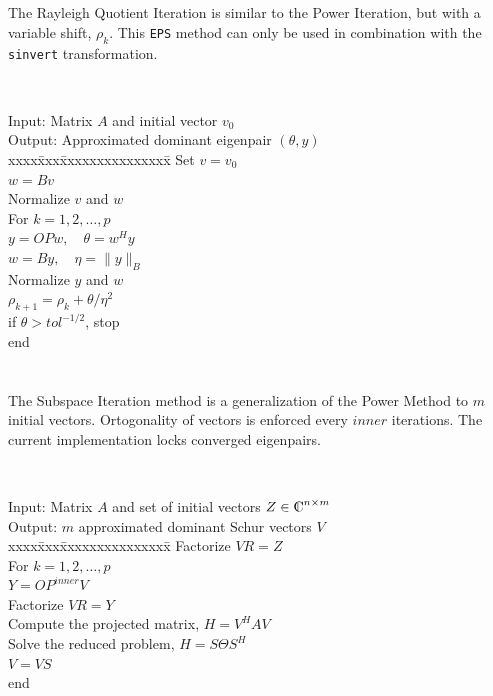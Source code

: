 \section{}

The Rayleigh Quotient Iteration is similar to the Power Iteration, but with a variable shift, $\rho_k$. This \texttt{EPS} method can only be used in combination with the \texttt{sinvert} transformation.
\begin{algorithm}~\rm
\begin{tabbing}
Input: Matrix $A$ and initial vector $v_0$\\
Output: Approximated dominant eigenpair $(\theta,y)$ \\
xxxx\=xxx\=xxxxxxxxxxxxxxx\=\kill
\> Set $v=v_0$\\
\> $w=Bv$\\
\> Normalize $v$ and $w$\\
\> For $k=1,2,\ldots,p$\\
\> \> $y=O\!Pw,\quad\theta=w^Hy$ \\
\> \> $w=By,\quad\eta=\|y\|_B$ \\
\> \> Normalize $y$ and $w$\\
\> \> $\rho_{k+1}=\rho_k+\theta/\eta^2$ \\
\> \> if $\theta>tol^{-1/2}$, stop\\
\> end
\end{tabbing}
\end{algorithm}

\section{}

The Subspace Iteration method is a generalization of the Power Method to $m$ initial vectors. Ortogonality of vectors is enforced every $inner$ iterations. The current implementation locks converged eigenpairs.

\begin{algorithm}~\rm
\begin{tabbing}
Input: Matrix $A$ and set of initial vectors $Z\in\Co^{n\times m} $\\
Output: $m$ approximated dominant Schur vectors $V$ \\
xxxx\=xxx\=xxxxxxxxxxxxxxx\=\kill
\> Factorize $VR=Z$\\
\> For $k=1,2,\ldots,p$\\
\> \> $Y=O\!P^{inner}V$ \\
\> \> Factorize $VR=Y$ \\
\> \> Compute the projected matrix, $H=V^HAV$ \\
\> \> Solve the reduced problem, $H=S\Theta S^H$ \\
\> \> $V=VS$ \\
\> end
\end{tabbing}
\end{algorithm}

